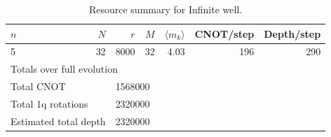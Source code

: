 \begin{table}[t]
\centering
\caption{Resource summary for Infinite well.}
\label{tab:resources_infinite_well}
\begin{tabular}{lrrrrrr}
\toprule
$n$ & $N$ & $r$ & $M$ & $\langle m_k\rangle$ & CNOT/step & Depth/step \\
\midrule
5 & 32 & 8000 & 32 & 4.03 & 196 & 290 \\
\midrule
\multicolumn{4}{l}{Totals over full evolution} & & & \\
\multicolumn{2}{l}{Total CNOT} & \multicolumn{5}{l}{1568000} \\
\multicolumn{2}{l}{Total 1q rotations} & \multicolumn{5}{l}{2320000} \\
\multicolumn{2}{l}{Estimated total depth} & \multicolumn{5}{l}{2320000} \\
\bottomrule
\end{tabular}
\end{table}
